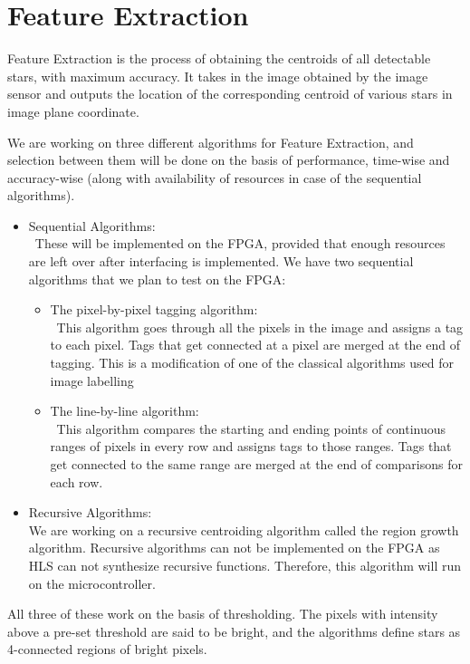 \section{Feature Extraction}
\thispagestyle{fancy}

Feature Extraction is the process of obtaining the centroids of all detectable stars, with maximum accuracy. It takes in the image obtained by the image sensor and outputs the location of the corresponding centroid of various stars in image plane coordinate.

We are working on three different algorithms for Feature Extraction, and selection between them will be done on the basis of performance, time-wise and accuracy-wise (along with availability of resources in case of the sequential algorithms).
\begin{itemize}
    \item Sequential Algorithms:\\
    \ These will be implemented on the FPGA, provided that enough resources are left over after interfacing is implemented. We have two sequential algorithms that we plan to test on the FPGA:
    \begin{itemize}
        \item The pixel-by-pixel tagging algorithm:\\
        \ This algorithm goes through all the pixels in the image and assigns a tag to each pixel. Tags that get connected at a pixel are merged at the end of tagging. This is a modification of one of the classical algorithms used for image labelling %
        \item The line-by-line algorithm:\\
        \ This algorithm compares the starting and ending points of continuous ranges of pixels in every row and assigns tags to those ranges. Tags that get connected to the same range are merged at the end of comparisons for each row. %
    \end{itemize}
    \item Recursive Algorithms:\\
    We are working on a recursive centroiding algorithm called the region growth algorithm. Recursive algorithms can not be implemented on the FPGA as HLS can not synthesize recursive functions. Therefore, this algorithm will run on the microcontroller.
\end{itemize}

All three of these work on the basis of thresholding. The pixels with intensity above a pre-set threshold are said to be bright, and the algorithms define stars as 4-connected regions of bright pixels. 

